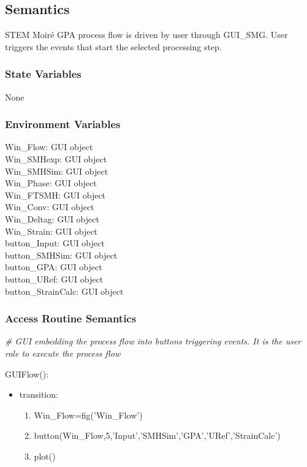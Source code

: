 \documentclass[12pt, titlepage]{article}
\newcommand{\progname}{STEM Moir{\'e} GPA}
\begin{document}
\subsection{Semantics}

\progname{} process flow is driven by user through GUI{\_}SMG. User triggers the 
events that start the selected processing step. 

\subsubsection{State Variables}
None

\subsubsection{Environment Variables}

\noindent Win{\_}Flow: GUI object\\
Win{\_}SMHexp: GUI object\\
Win{\_}SMHSim: GUI object\\
Win{\_}Phase: GUI object\\
Win{\_}FTSMH: GUI object\\
Win{\_}Conv: GUI object\\
Win{\_}Deltag: GUI object\\
Win{\_}Strain: GUI object\\
button{\_}Input: GUI object\\
button{\_}SMHSim: GUI object\\
button{\_}GPA: GUI object\\
button{\_}URef: GUI object\\
button{\_}StrainCalc: GUI object\\


\subsubsection{Access Routine Semantics}

\noindent\textit{{\#} GUI embedding the process flow into buttons triggering 
events. It is the user role to execute the process flow}\medskip

\noindent GUIFlow():
\begin{itemize}
\item transition: 
	\begin{enumerate}
	\item Win{\_}Flow=fig('Win{\_}Flow') 
	\item button(Win{\_}Flow,5,'Input','SMHSim','GPA','URef','StrainCalc') 
	\item plot()
	\end{enumerate} 
\end{itemize}
\bigskip
\end{document}

